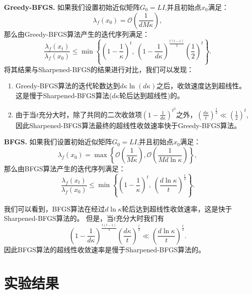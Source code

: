 \documentclass[a4paper,twoside,AutoFakeBold]{article}
\theoremstyle{definition}
\begin{document}
\noindent \textbf{Greedy-BFGS.}
如果我们设置初始近似矩阵$G_0=LI$,并且初始点$x_0$满足：
\begin{equation*}
    \lambda_f(x_0) = \mathcal{O}\left(\frac{1}{dM\kappa}\right),
\end{equation*}
那么由Greedy-BFGS算法产生的迭代序列满足：
\begin{equation*}
    \frac{\lambda_f(x_t)}{\lambda_f(x_0)} \leq
    \min\left\{\left(1 \!-\! \frac{1}{\kappa}\right)^t ,\  \left(1 \!-\! \frac{1}{d\kappa}\right)^{\!\frac{t(t - 1)}{2}}\!\! \left(\frac{1}{2}\right)^{t} \right\}.
\end{equation*}
将其结果与Sharpened-BFGS的结果进行对比，我们可以发现：

\begin{enumerate}
    \item Greedy-BFGS算法的迭代轮数达到$d\kappa\ln{(d\kappa)}$之后，收敛速度达到超线性。这是慢于Sharpened-BFGS算法($d\kappa$轮后达到超线性)的。
    \item 由于当$t$充分大时，除了共同的二次收敛项$(1 - \frac{1}{d\kappa})^{t^2}$之外，$(\frac{d\kappa}{t})^{\frac{t}{2}} \ll (\frac{1}{2})^{t}$,因此Sharpened-BFGS算法最终的超线性收敛速率快于Greedy-BFGS算法。
\end{enumerate}

\noindent \textbf{BFGS.}
如果我们设置初始近似矩阵$G_0=LI$,并且初始点$x_0$满足：
\begin{equation*}
    \lambda_f(x_0) = \max\left\{\mathcal{O}\left(\frac{1}{M\kappa}\right), \mathcal{O}\left(\frac{1}{Md\ln{\kappa}}\right)\right\},
\end{equation*}
那么由BFGS算法产生的迭代序列满足：
\begin{equation*}
    \frac{\lambda_f(x_t)}{\lambda_f(x_0)} \leq
    \min\left\{\left(1 \!-\! \frac{1}{\kappa}\right)^t ,\ \left(\frac{d\ln{\kappa}}{t}\right)^{\frac{t}{2}} \right\}.
\end{equation*}

我们可以看到，BFGS算法在经过$d\ln\kappa$轮后达到超线性收敛速率，这是快于Sharpened-BFGS算法的。
但是，当$t$充分大时我们有
\begin{equation*}
    \left(1 \!-\! \frac{1}{d\kappa}\right)^{\!\frac{t(t - 1)}{4}}\!\! \left(\frac{d\kappa}{t}\right)^{\frac{t}{2}}
    \ll 
    \left(\frac{d\ln{\kappa}}{t}\right)^{\frac{t}{2}}.
\end{equation*}
因此BFGS算法的超线性收敛速率是慢于Sharpened-BFGS算法的。

%
\section{实验结果}\label{section:experiment}
\end{document}
